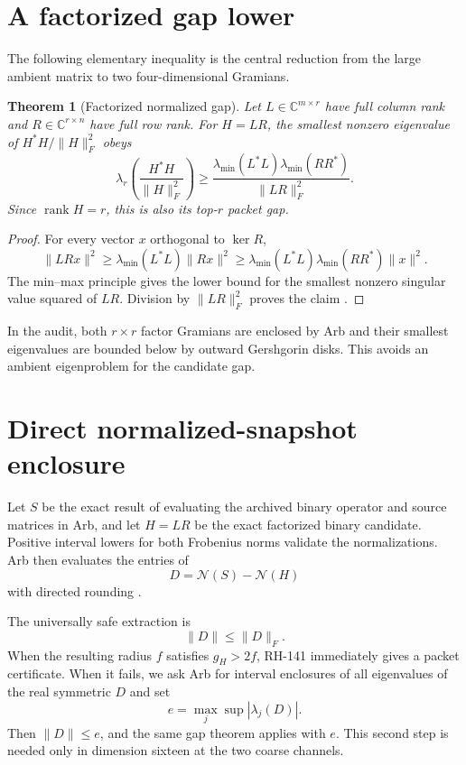 \documentclass[12pt]{article}
\newtheorem{theorem}{Theorem}
\begin{document}
\section{A factorized gap lower}
The following elementary inequality is the central reduction from the large
ambient matrix to two four-dimensional Gramians.

\begin{theorem}[Factorized normalized gap]\label{thm:gap}
Let $L\in\mathbb C^{m\times r}$ have full column rank and
$R\in\mathbb C^{r\times n}$ have full row rank.  For $H=LR$, the smallest
nonzero eigenvalue of $H^*H/\|H\|_F^2$ obeys
\[
 \lambda_r\!\left(\frac{H^*H}{\|H\|_F^2}\right)
 \geq
 \frac{\lambda_{\min}(L^*L)\lambda_{\min}(RR^*)}{\|LR\|_F^2}.
\]
Since $\operatorname{rank}H=r$, this is also its top-$r$ packet gap.
\end{theorem}

\begin{proof}
For every vector $x$ orthogonal to $\ker R$,
\[
 \|LRx\|^2
 \geq\lambda_{\min}(L^*L)\|Rx\|^2
 \geq\lambda_{\min}(L^*L)\lambda_{\min}(RR^*)\|x\|^2.
\]
The min--max principle gives the lower bound for the smallest nonzero
singular value squared of $LR$.  Division by $\|LR\|_F^2$ proves the claim
\citep{HornJohnson2013}.
\end{proof}

In the audit, both $r\times r$ factor Gramians are enclosed by Arb and their
smallest eigenvalues are bounded below by outward Gershgorin disks.  This
avoids an ambient eigenproblem for the candidate gap.

\section{Direct normalized-snapshot enclosure}
Let $S$ be the exact result of evaluating the archived binary operator and
source matrices in Arb, and let $H=LR$ be the exact factorized binary
candidate.  Positive interval lowers for both Frobenius norms validate the
normalizations.  Arb then evaluates the entries of
\[
 D=\mathcal N(S)-\mathcal N(H)
\]
with directed rounding \citep{Johansson2017}.

The universally safe extraction is
\[
 \|D\|\leq\|D\|_F.
\]
When the resulting radius $f$ satisfies $g_H>2f$, RH-141 immediately gives
a packet certificate.  When it fails, we ask Arb for interval enclosures of
all eigenvalues of the real symmetric $D$ and set
\[
 e=\max_j\sup |\lambda_j(D)|.
\]
Then $\|D\|\leq e$, and the same gap theorem applies with $e$.  This second
step is needed only in dimension sixteen at the two coarse channels.
\end{document}

